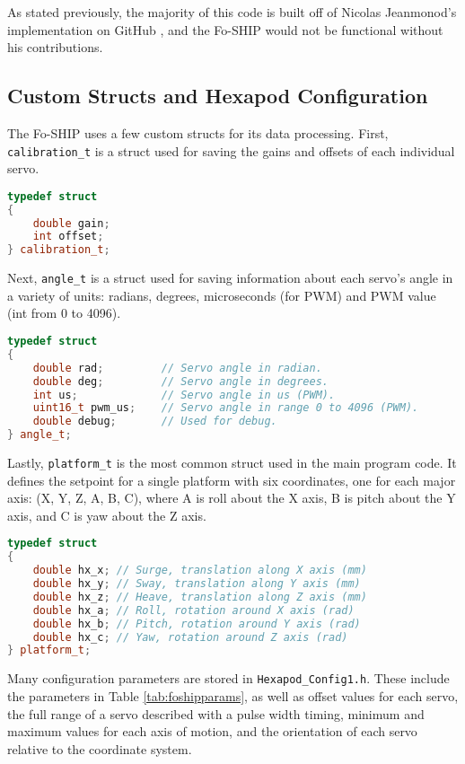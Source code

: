 \documentclass[12pt,a4paper]{report}
\begin{document}
As stated previously, the majority of this code is built off of Nicolas Jeanmonod’s implementation on GitHub \cite{nichub}, and the Fo-SHIP would not be functional without his contributions.

\subsection{Custom Structs and Hexapod Configuration} \label{ssec:2s5s1}
The Fo-SHIP uses a few custom structs for its data processing. First, \verb|calibration_t| is a struct used for saving the gains and offsets of each individual servo. 

\begin{lstlisting}[language=C++]
typedef struct
{
	double gain;
	int offset;
} calibration_t;
\end{lstlisting}

Next, \verb|angle_t| is a struct used for saving information about each servo’s angle in a variety of units: radians, degrees, microseconds (for PWM) and PWM value (int from 0 to 4096).

\begin{lstlisting}[language=C++]
typedef struct
{
	double rad;			// Servo angle in radian.
	double deg;			// Servo angle in degrees.
	int us;				// Servo angle in us (PWM).
	uint16_t pwm_us; 	// Servo angle in range 0 to 4096 (PWM).
	double debug;		// Used for debug.
} angle_t;
\end{lstlisting}

Lastly, \verb|platform_t| is the most common struct used in the main program code. It defines the setpoint for a single platform with six coordinates, one for each major axis: (X, Y, Z, A, B, C), where A is roll about the X axis, B is pitch about the Y axis, and C is yaw about the Z axis.

\begin{lstlisting}[language=C++]
typedef struct
{
	double hx_x; // Surge, translation along X axis (mm)
	double hx_y; // Sway, translation along Y axis (mm)
	double hx_z; // Heave, translation along Z axis (mm)
	double hx_a; // Roll, rotation around X axis (rad)
	double hx_b; // Pitch, rotation around Y axis (rad)
	double hx_c; // Yaw, rotation around Z axis (rad)
} platform_t;
\end{lstlisting}

Many configuration parameters are stored in \verb|Hexapod_Config1.h|. These include the parameters in Table \ref{tab:foshipparams}, as well as offset values for each servo, the full range of a servo described with a pulse width timing, minimum and maximum values for each axis of motion, and the orientation of each servo relative to the coordinate system.
\end{document}
